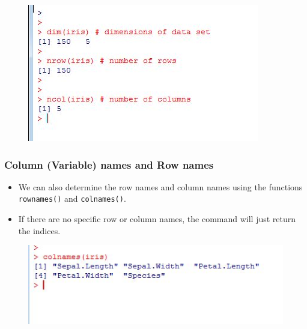 \documentclass{beamer}
\begin{document}
 	\begin{frame}
 		\begin{figure}
 			\centering
 			\includegraphics[width=1.2\linewidth]{images/dimsiris}
 		\end{figure}
 		
 		
 		
 	\end{frame}
 	\begin{frame}
 		\frametitle{Column (Variable) names and Row names}
 		\begin{itemize}
 			\item We can also determine the row names and column names using the functions \texttt{rownames()}
 			and \texttt{colnames()}. 
 			\item If there are no specific row or column names, the command will just return
 			the indices.
 		\end{itemize}
 		\begin{figure}
 			\centering
 			\includegraphics[width=1.0\linewidth]{images/colnamesiris}
 		\end{figure}
 		
 	\end{frame}
\end{document}
